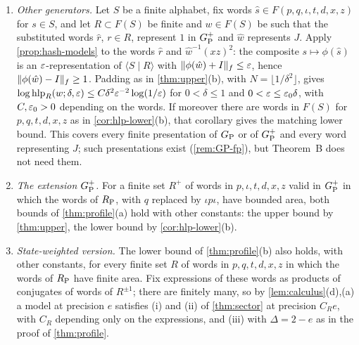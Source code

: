 \begin{remark}\label{rem:upper-presentations}
\leavevmode
\begin{enumerate}[label=(\alph*),itemsep=1pt]
\item \emph{Other generators.} Let $S$ be a finite alphabet, fix words $\hat s\in F(p,q,\iota,t,d,x,z)$ for $s\in S$, and let $R\subset F(S)$
be finite and $w\in F(S)$ be such that the substituted words $\hat r$, $r\in R$, represent $1$ in $G_{\mathrm P}^{+}$ and $\hat w$ represents $J$. Apply
\cref{prop:hash-models} to the words $\hat r$ and $\hat w^{-1}(xz)^2$: the composite $s\mapsto\phi(\hat s)$ is an $\varepsilon$-representation of
$\langle S\mid R\rangle$ with $\lVert \phi(\hat w)+I\rVert_f\le\varepsilon$, hence $\lVert \phi(\hat w)-I\rVert_f\ge1$. Padding as in \cref{thm:upper}(b), with
$N=\lfloor1/\delta^2\rfloor$, gives $\log\operatorname{hlp}_R(w;\delta,\varepsilon)\le C\delta^2\varepsilon^{-2}\log(1/\varepsilon)$ for $0<\delta\le1$ and $0<\varepsilon\le\varepsilon_0\delta$,
with $C,\varepsilon_0>0$ depending on the words. If moreover there are words in $F(S)$ for $p,q,t,d,x,z$ as in \cref{cor:hlp-lower}(b), that
corollary gives the matching lower bound. This covers every finite presentation of $G_{\mathrm P}$ or of $G_{\mathrm P}^{+}$ and every word representing $J$; such
presentations exist (\cref{rem:GP-fp}), but Theorem~B does not need them.
\item \emph{The extension $G_{\mathrm P}^{+}$.} For a finite set $R^+$ of words in $p,\iota,t,d,x,z$ valid in $G_{\mathrm P}^{+}$ in which the words of $R_{\mathrm P}$, with
$q$ replaced by $\iota p\iota$, have bounded area, both bounds of \cref{thm:profile}(a) hold with other constants: the upper bound by
\cref{thm:upper}, the lower bound by \cref{cor:hlp-lower}(b).
\item \emph{State-weighted version.} The lower bound of \cref{thm:profile}(b) also holds, with other constants, for every finite set $R$
of words in $p,q,t,d,x,z$ in which the words of $R_{\mathrm P}$ have finite area. Fix expressions of these words as products of conjugates of words
of $R^{\pm1}$; there are finitely many, so by \cref{lem:calculus}(d),(a) a model at precision $e$ satisfies (i) and (ii) of
\cref{thm:sector} at precision $C_Re$, with $C_R$ depending only on the expressions, and (iii) with $\Delta=2-e$ as in the proof of
\cref{thm:profile}.
\end{enumerate}
\end{remark}
